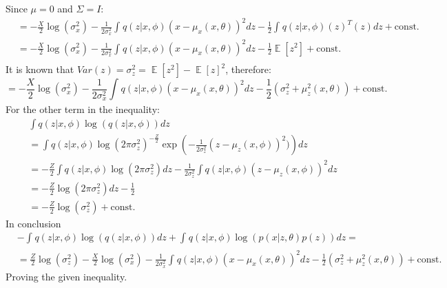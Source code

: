 \documentclass[fleqn]{article}
\DeclareMathOperator{\E}{\mathbb{E}}
\begin{document}
Since $\mu = 0$ and $\Sigma = I$:
\begin{equation}
    \begin{split}
        & = - \frac{X}{2}\log\left(\sigma_{x}^{2}\right) -\frac{1}{2\sigma^{2}_{x}} \int_{}{}q(z|x, \phi)(x-\mu_{x}(x, \theta))^{2}dz - \frac{1}{2}\int_{}{}q(z|x, \phi) (z)^{T}(z)dz + \mathrm{const.} \\
        & = -\frac{X}{2}\log\left(\sigma_{x}^{2}\right) -\frac{1}{2\sigma^{2}_{x}} \int_{}{}q(z|x, \phi)(x-\mu_{x}(x, \theta))^{2}dz - \frac{1}{2}\E\left[z^2\right] + \mathrm{const.} \\
    \end{split}
\end{equation}
It is known that $Var(z) = \sigma^2_z = \E\left[z^2 \right] - \E\left[z \right]^2$, therefore:
\begin{equation}
    = - \frac{X}{2}\log\left(\sigma_{x}^{2}\right) -\frac{1}{2\sigma^{2}_{x}} \int_{}{}q(z|x, \phi)(x-\mu_{x}(x, \theta))^{2}dz - \frac{1}{2}\left(\sigma^2_z + \mu_z^2(x,\theta)\right)+ \mathrm{const.}
\end{equation}
For the other term in the inequality:
\begin{equation}
    \begin{split}
        & \int q(z|x,\phi)\log(q(z|x,\phi)) dz \\
        & = \int q(z|x,\phi)\log\left(2\pi\sigma_z^2\right)^{-\frac{Z}{2}}\exp\left(-\frac{1}{2\sigma_z^2}(z-\mu_z(x,\phi))^2)\right) dz \\
        & = - \frac{Z}{2} \int q(z|x,\phi) \log\left(2\pi\sigma_z^2\right) dz - \frac{1}{2\sigma_z^2}\int q(z|x,\phi)(z-\mu_z(x,\phi))^2 dz \\
        & = - \frac{Z}{2} \log\left(2\pi\sigma_z^2\right) dz - \frac{1}{2} \\
        & = - \frac{Z}{2}\log\left(\sigma_z^2\right)+ \mathrm{const.}
    \end{split}
\end{equation}
In conclusion
\begin{equation}
    \begin{split}
        & -\int_{}{}q(z|x, \phi)\log(q(z|x, \phi)) dz + \int_{}{}q(z|x, \phi)\log(p(x|z, \theta)p(z)) dz = \\
        & = \frac{Z}{2}\log\left(\sigma_z^2\right) - \frac{X}{2}\log\left(\sigma_{x}^{2}\right) -\frac{1}{2\sigma^{2}_{x}} \int_{}{}q(z|x, \phi)(x-\mu_{x}(x, \theta))^{2}dz - \frac{1}{2}\left(\sigma^2_z + \mu_z^2(x,\theta)\right)+ \mathrm{const.}
    \end{split}
\end{equation}
Proving the given inequality.
\end{document}
